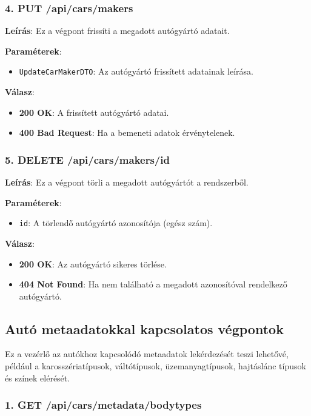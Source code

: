 \documentclass{report}[11pt]
\begin{document}
\subsubsection{4. PUT /api/cars/makers}

\textbf{Leírás}:  
Ez a végpont frissíti a megadott autógyártó adatait.

\textbf{Paraméterek}:  
\begin{itemize}
    \item \texttt{UpdateCarMakerDTO}: Az autógyártó frissített adatainak leírása.
\end{itemize}

\textbf{Válasz}:  
\begin{itemize}
    \item \textbf{200 OK}: A frissített autógyártó adatai.
    \item \textbf{400 Bad Request}: Ha a bemeneti adatok érvénytelenek.
\end{itemize}

\subsubsection{5. DELETE /api/cars/makers/{id}}

\textbf{Leírás}:  
Ez a végpont törli a megadott autógyártót a rendszerből.

\textbf{Paraméterek}:  
\begin{itemize}
    \item \texttt{id}: A törlendő autógyártó azonosítója (egész szám).
\end{itemize}

\textbf{Válasz}:  
\begin{itemize}
    \item \textbf{200 OK}: Az autógyártó sikeres törlése.
    \item \textbf{404 Not Found}: Ha nem található a megadott azonosítóval rendelkező autógyártó.
\end{itemize}

\subsection{Autó metaadatokkal kapcsolatos végpontok}

Ez a vezérlő az autókhoz kapcsolódó metaadatok lekérdezését teszi lehetővé, például a karosszériatípusok, váltótípusok, üzemanyagtípusok, hajtáslánc típusok és színek elérését.

\subsubsection{1. GET /api/cars/metadata/bodytypes}
\end{document}
